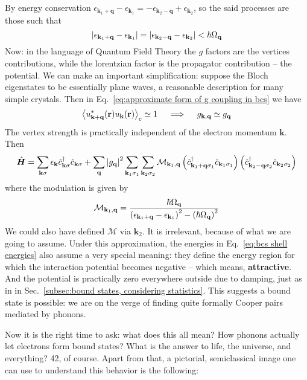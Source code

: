 By energy conservation $\epsilon_{\mathbf{k}_1+\mathbf{q}} - \epsilon_{\mathbf{k}_1} = - \epsilon_{\mathbf{k}_2-\mathbf{q}} + \epsilon_{\mathbf{k}_2}$, so the said processes are those such that
\begin{equation}\label{eq:bcs shell energies}
	\abs{\epsilon_{\mathbf{k}_1+\mathbf{q}} - \epsilon_{\mathbf{k}_1}} = \abs{\epsilon_{\mathbf{k}_2-\mathbf{q}} - \epsilon_{\mathbf{k}_2}} < \hbar\Omega_\mathbf{q}
\end{equation}
Now: in the language of Quantum Field Theory the $g$ factors are the vertices contributions, while the lorentzian factor is the propagator contribution -- the potential. We can make an important simplification: suppose the Bloch eigenstates to be essentially plane waves, a reasonable description for many simple crystals. Then in Eq.~\eqref{eq:approximate form of g coupling in bcs} we have
\[
	\ev{u_{\mathbf{k}+\mathbf{q}}^*(\mathbf{r}) u_\mathbf{k}(\mathbf{r})}_c \simeq 1
	\quad\implies\quad
	g_{\mathbf{k},\mathbf{q}} \simeq g_\mathbf{q}
\]
The vertex strength is practically independent of the electron momentum $\mathbf{k}$. Then
\[
	\hat{\bm H} = \sum_{\mathbf{k}\sigma} \epsilon_{\mathbf{k}} \hat{c}_{\mathbf{k}\sigma}^\dagger \hat{c}_{\mathbf{k}\sigma} + \sum_\mathbf{q} \abs{g_\mathbf{q}}^2 \sum_{\mathbf{k}_1 \sigma_1} \sum_{\mathbf{k}_2 \sigma_2} \mathcal{M}_{\mathbf{k}_1,\mathbf{q}} \left({\hat{c}_{\mathbf{k}_1+\mathbf{q}\sigma_1}^\dagger \hat{c}_{\mathbf{k}_1\sigma_1}}\right) \left({\hat{c}_{\mathbf{k}_2-\mathbf{q}\sigma_2}^\dagger \hat{c}_{\mathbf{k}_2\sigma_2}}\right)
\]
where the modulation is given by
\[
	\mathcal{M}_{\mathbf{k}_1,\mathbf{q}} = \frac{
		\hbar\Omega_\mathbf{q}
	}{
		\left({\epsilon_{\mathbf{k}_1+\mathbf{q}} - \epsilon_{\mathbf{k}_1}}\right)^2 - \left({\hbar\Omega_\mathbf{q}}\right)^2
	}
\]
We could also have defined $\mathcal{M}$ via $\mathbf{k}_2$. It is irrelevant, because of what we are going to assume. Under this approximation, the energies in Eq.~\eqref{eq:bcs shell energies} also assume a very special meaning: they define the energy region for which the interaction potential becomes negative -- which means, \textbf{attractive}. And the potential is practically zero everywhere outside due to damping, just as in in Sec.~\ref{subsec:bound states, considering statistics}. This suggests a bound state is possible: we are on the verge of finding quite formally Cooper pairs mediated by phonons.

Now it is the right time to ask: what does this all mean? How phonons actually let electrons form bound states? What is the answer to life, the universe, and everything? 42, of course. Apart from that, a pictorial, semiclassical image one can use to understand this behavior is the following:


